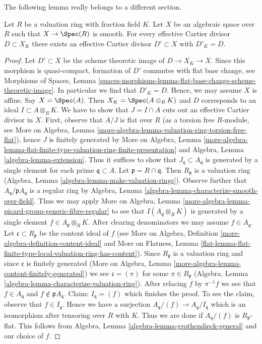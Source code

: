 \noindent
The following lemma really belongs to a different section.

\begin{lemma}
\label{lemma-smooth-over-valuation-ring-effective-Cartier}
Let $R$ be a valuation ring with fraction field $K$.
Let $X$ be an algebraic space over $R$ such that $X \to \Spec(R)$
is smooth. For every effective Cartier divisor $D \subset X_K$
there exists an effective Cartier divisor $D' \subset X$
with $D'_K = D$.
\end{lemma}

\begin{proof}
Let $D' \subset X$ be the scheme theoretic image of $D \to X_K \to X$.
Since this morphism is quasi-compact, formation of $D'$
commutes with flat base change, see
Morphisms of Spaces, Lemma
\ref{spaces-morphisms-lemma-flat-base-change-scheme-theoretic-image}.
In particular we find that $D'_K = D$. Hence,
we may assume $X$ is affine. Say $X = \Spec(A)$.
Then $X_K = \Spec(A \otimes_R K)$ and $D$ corresponds to
an ideal $I \subset A \otimes_R K$. We have to show that
$J = I \cap A$ cuts out an effective Cartier divisor in $X$.
First, observe that $A/J$ is flat over $R$ (as a torsion
free $R$-module, see More on Algebra, Lemma
\ref{more-algebra-lemma-valuation-ring-torsion-free-flat}),
hence $J$ is finitely generated by
More on Algebra, Lemma
\ref{more-algebra-lemma-flat-finite-type-valuation-ring-finite-presentation}
and
Algebra, Lemma \ref{algebra-lemma-extension}.
Thus it suffices to show that $J_\mathfrak q \subset A_\mathfrak q$
is generated by a single element for each prime $\mathfrak q \subset A$.
Let $\mathfrak p = R \cap \mathfrak q$. Then
$R_\mathfrak p$ is a valuation ring
(Algebra, Lemma \ref{algebra-lemma-make-valuation-rings}).
Observe further that $A_\mathfrak q/\mathfrak p A_\mathfrak q$
is a regular ring by Algebra, Lemma
\ref{algebra-lemma-characterize-smooth-over-field}.
Thus we may apply More on Algebra, Lemma
\ref{more-algebra-lemma-picard-group-generic-fibre-regular}
to see that $I(A_\mathfrak q \otimes_R K)$ is generated by
a single element $f \in A_\mathfrak p \otimes_R K$.
After clearing denominators we may assume $f \in A_\mathfrak q$.
Let $\mathfrak c \subset R_\mathfrak p$ be the content ideal of $f$
(see More on Algebra, Definition \ref{more-algebra-definition-content-ideal}
and More on Flatness, Lemma
\ref{flat-lemma-flat-finite-type-local-valuation-ring-has-content}).
Since $R_\mathfrak p$ is a valuation ring and
since $\mathfrak c$ is finitely generated
(More on Algebra, Lemma \ref{more-algebra-lemma-content-finitely-generated})
we see $\mathfrak c = (\pi)$ for some $\pi \in R_\mathfrak p$
(Algebra, Lemma \ref{algebra-lemma-characterize-valuation-ring}).
After relacing $f$ by $\pi^{-1}f$ we see that $f \in A_\mathfrak q$
and $f \not \in \mathfrak pA_\mathfrak q$.
Claim: $I_\mathfrak q = (f)$ which finishes the proof.
To see the claim, observe that $f \in I_\mathfrak q$.
Hence we have a surjection $A_\mathfrak q/(f) \to A_\mathfrak q/I_\mathfrak q$
which is an isomorphism after tensoring over $R$ with $K$.
Thus we are done if
$A_\mathfrak q/(f)$ is $R_\mathfrak p$-flat.
This follows from
Algebra, Lemma \ref{algebra-lemma-grothendieck-general}
and our choice of $f$.
\end{proof}
